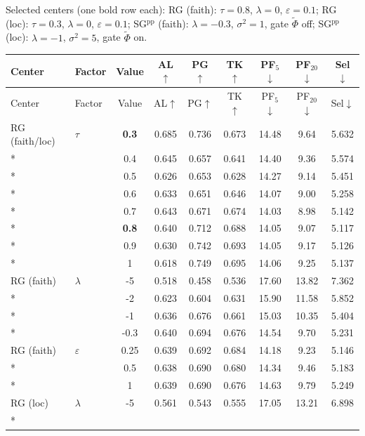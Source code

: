 \noindent Selected centers (one bold row each): RG (faith): $\tau{=}0.8$, $\lambda{=}0$, $\varepsilon{=}0.1$; RG (loc): $\tau{=}0.3$, $\lambda{=}0$, $\varepsilon{=}0.1$; SG$^{\mathrm{pp}}$ (faith): $\lambda{=}{-}0.3$, $\sigma^2{=}1$, gate $\tilde\Phi$ off; SG$^{\mathrm{pp}}$ (loc): $\lambda{=}{-}1$, $\sigma^2{=}5$, gate $\tilde\Phi$ on.\par
\begin{longtable}{@{}l l c c c c c c c@{}}
\toprule
Center & Factor & Value & AL$\uparrow$ & PG$\uparrow$ & TK$\uparrow$ & PF$_5$$\downarrow$ & PF$_{20}$$\downarrow$ & Sel$\downarrow$ \\
\midrule
\endfirsthead
\toprule
Center & Factor & Value & AL$\uparrow$ & PG$\uparrow$ & TK$\uparrow$ & PF$_5$$\downarrow$ & PF$_{20}$$\downarrow$ & Sel$\downarrow$ \\
\midrule
\endhead
\bottomrule
\endlastfoot
RG (faith/loc) & $\tau$ & \textbf{0.3} & 0.685 & 0.736 & 0.673 & 14.48 & 9.64 & 5.632 \\*
 &  & 0.4 & 0.645 & 0.657 & 0.641 & 14.40 & 9.36 & 5.574 \\*
 &  & 0.5 & 0.626 & 0.653 & 0.628 & 14.27 & 9.14 & 5.451 \\*
 &  & 0.6 & 0.633 & 0.651 & 0.646 & 14.07 & 9.00 & 5.258 \\*
 &  & 0.7 & 0.643 & 0.671 & 0.674 & 14.03 & 8.98 & 5.142 \\*
 &  & \textbf{0.8} & 0.640 & 0.712 & 0.688 & 14.05 & 9.07 & 5.117 \\*
 &  & 0.9 & 0.630 & 0.742 & 0.693 & 14.05 & 9.17 & 5.126 \\*
 &  & 1 & 0.618 & 0.749 & 0.695 & 14.06 & 9.25 & 5.137 \\
\midrule
RG (faith) & $\lambda$ & {-}5 & 0.518 & 0.458 & 0.536 & 17.60 & 13.82 & 7.362 \\*
 &  & {-}2 & 0.623 & 0.604 & 0.631 & 15.90 & 11.58 & 5.852 \\*
 &  & {-}1 & 0.636 & 0.676 & 0.661 & 15.03 & 10.35 & 5.404 \\*
 &  & {-}0.3 & 0.640 & 0.694 & 0.676 & 14.54 & 9.70 & 5.231 \\
\midrule
RG (faith) & $\varepsilon$ & 0.25 & 0.639 & 0.692 & 0.684 & 14.18 & 9.23 & 5.146 \\*
 &  & 0.5 & 0.638 & 0.690 & 0.680 & 14.34 & 9.46 & 5.183 \\*
 &  & 1 & 0.639 & 0.690 & 0.676 & 14.63 & 9.79 & 5.249 \\
\midrule
RG (loc) & $\lambda$ & {-}5 & 0.561 & 0.543 & 0.555 & 17.05 & 13.21 & 6.898 \\*

\end{longtable}
